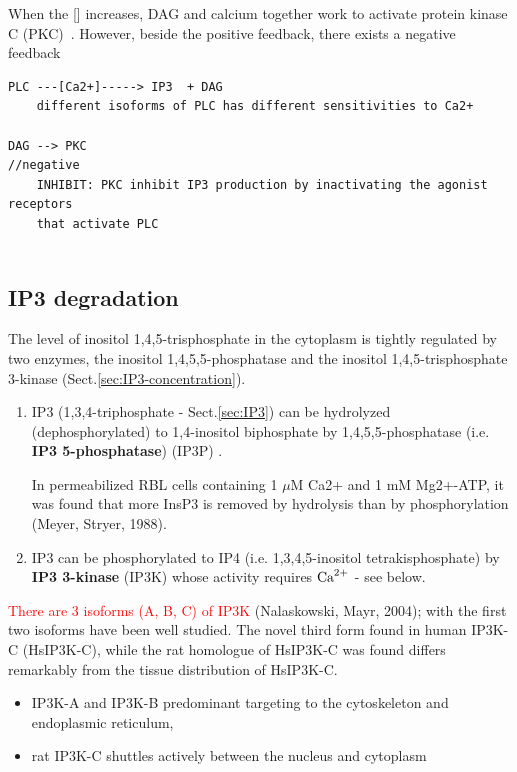 When the [] increases, DAG and calcium together work to
activate protein kinase C (PKC)~\citep{nishizuka1988mhp}.  
However, beside the positive feedback, there exists a negative
feedback 

{\tiny
\begin{verbatim}
PLC ---[Ca2+]-----> IP3  + DAG
	different isoforms of PLC has different sensitivities to Ca2+

DAG --> PKC
//negative
    INHIBIT: PKC inhibit IP3 production by inactivating the agonist receptors
    that activate PLC
	
\end{verbatim}
}


\subsection{IP3 degradation}
\label{sec:IP3-degradation}
\label{sec:IP3K}
\label{sec:IP3-5-phosphatase}
\label{sec:IP3P}

The level of inositol 1,4,5-trisphosphate in the cytoplasm is tightly regulated
by two enzymes, the inositol 1,4,5,5-phosphatase and the inositol
1,4,5-trisphosphate 3-kinase (Sect.\ref{sec:IP3-concentration}).
\begin{enumerate}
  
  \item IP3 (1,3,4-triphosphate - Sect.\ref{sec:IP3}) can be hydrolyzed
  (dephosphorylated) to 1,4-inositol biphosphate  by 1,4,5,5-phosphatase
  (i.e. {\bf IP3 5-phosphatase}) (IP3P) .

In permeabilized RBL cells containing 1 $\mu$M Ca2+ and 1 mM Mg2+-ATP, it
was found that more InsP3 is removed by hydrolysis than by phosphorylation
(Meyer, Stryer, 1988).
  
  \item IP3 can be phosphorylated to IP4 (i.e. 1,3,4,5-inositol
  tetrakisphosphate) by {\bf IP3 3-kinase} (IP3K) whose activity requires ${\text{Ca}^{2+}}$
  - see below.
  
   
\end{enumerate}

\textcolor{red}{There are 3 isoforms (A, B, C) of IP3K} (Nalaskowski, Mayr,
2004); with the first two isoforms have been well studied. The novel third form
found in human IP3K-C (HsIP3K-C), while the  rat homologue of HsIP3K-C was found
differs remarkably from the tissue distribution of HsIP3K-C.
\begin{itemize}
  \item  IP3K-A and IP3K-B predominant targeting to the cytoskeleton and
  endoplasmic reticulum, 
  
  \item rat IP3K-C shuttles actively between the nucleus and cytoplasm
\end{itemize}

